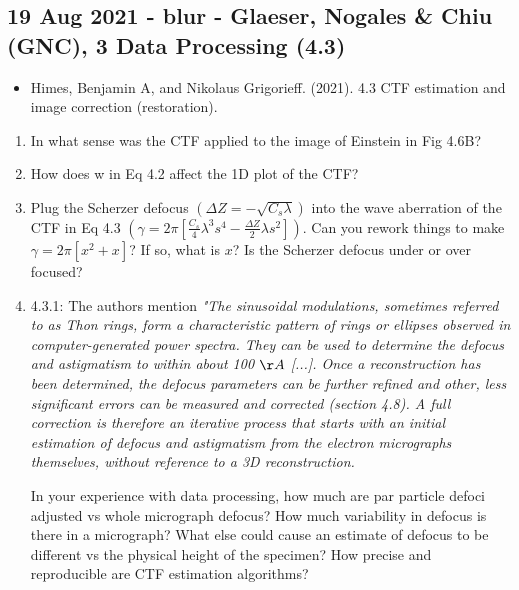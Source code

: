 \documentclass[11pt, oneside]{article}   	%
\begin{document}
\subsection{19 Aug 2021 - blur - Glaeser, Nogales \& Chiu (GNC), 3 Data Processing (4.3)}
\begin{itemize}
	\item Himes, Benjamin A, and Nikolaus Grigorieff. (2021). 4.3 CTF estimation and image correction (restoration).
\end{itemize}
\begin{enumerate}
	\item In what sense was the CTF applied to the image of Einstein in Fig 4.6B?
	\item How does w in Eq 4.2 affect the 1D plot of the CTF?
	\item Plug the Scherzer defocus $(\Delta Z = - \sqrt{C_s\lambda})$ into the wave aberration of the CTF in Eq 4.3 
	$(\gamma = 2\pi [ \frac{C_s}{4}\lambda^3 s^4 - \frac{\Delta Z}{2}\lambda s^2 ])$. Can you rework things to make $\gamma = 2 \pi [x^2 + x]$? If so, what is $x$? Is the Scherzer defocus under or over focused?
	\item 4.3.1: The authors mention {\it "The sinusoidal modulations, sometimes referred to as Thon rings, form a characteristic pattern of rings or ellipses observed in computer-generated power spectra. They can be used to determine the defocus and astigmatism to within about 100 $\AA$ [...]. Once a reconstruction has been determined, the defocus parameters can be further refined and other, less significant errors can be measured and corrected (section 4.8). A full correction is therefore an iterative process that starts with an initial estimation of defocus and astigmatism from the electron micrographs themselves, without reference to a 3D reconstruction.}

In your experience with data processing, how much are par particle defoci adjusted vs whole micrograph defocus? How much variability in defocus is there in a micrograph? What else could cause an estimate of defocus to be different vs the physical height of the specimen? How precise and reproducible are CTF estimation algorithms?


\end{enumerate}
\end{document}
